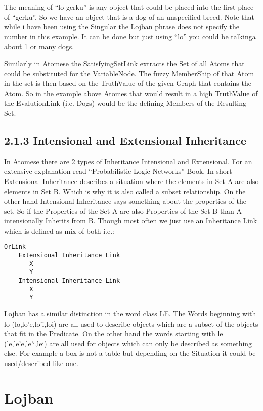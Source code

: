 The meaning of “lo gerku” is any object that could be placed into the first place of “gerku”. So we have an object that is a dog of an unspecified breed. Note that while i have been using the Singular the Lojban phrase does not specify the number in this example. It can be done but just using “lo” you could be talkinga about 1 or many dogs.

Similarly in Atomese the SatisfyingSetLink extracts the Set of all Atoms that could be substituted for the VariableNode. The fuzzy MemberShip of that Atom in the set is then based on the TruthValue of the given Graph that contains the Atom. So in the example above Atomes that would result in a high TruthValue of the EvalutionLink (i.e. Dogs) would be the defining Members of the Resulting Set.

\subsection{2.1.3 Intensional and Extensional Inheritance}

In Atomese there are 2 types of Inheritance Intensional and Extensional. For an extensive explanation read “Probabilistic Logic Networks” Book. In short Extensional Inheritance describes a situation where the elements in Set A are also elements in Set B. Which is why it is also called a subset relationship. On the other hand Intensional Inheritance says something about the properties of the set. So if the Properties of the Set A are also Properties of the Set B than A intensionally Inherits from B.
Though most often we just use an Inheritance Link which is defined as mix of both i.e.:

\begin{lstlisting}
OrLink
    Extensional Inheritance Link
       X
       Y
    Intensional Inheritance Link
       X
       Y
\end{lstlisting}

Lojban has a similar distinction in the word class LE. The Words beginning with lo (lo,lo’e,lo’i,loi) are all used to describe objects which are a subset of the objects that fit in the Predicate. On the other hand the words starting with le (le,le’e,le’i,lei) are all used for objects which can only be described as something else. For example a box is not a table but depending on the Situation it could be used/described like one.


\section{Lojban}

